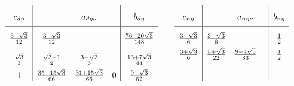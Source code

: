 %


\begin{eqnarray*}


\begin{array}{c|ccc|c}


c_{d\eta} & & a_{d\eta\nu} & & b_{d\eta}\vrule height6mm width0mm depth3mm\\


\hline


\frac{ 3-\sqrt{3}}{ 12} & \frac{ 3-\sqrt{3}}{ 12}&


& & \frac{ 76- 20\sqrt{3}}{ 143} \vrule height6mm width0mm depth3mm\\


\frac{ \sqrt{3}}{ 3} &


\frac{ \sqrt{3}-1}{ 2} &


\frac{ 3-\sqrt{3}}{ 6} 


& & \frac{ 13+ 7\sqrt{3}}{ 44} \vrule height6mm width0mm depth3mm\\


1& \frac{ 35 - 15\sqrt{3}}{ 66}&


\frac{ 31+15\sqrt{3}}{ 66} & 0


& \frac{ 9-\sqrt{3}}{ 52} 


\end{array}


%


\qquad


%


\begin{array}{c|ccc|c}


c_{n\eta} & & a_{n\eta\nu} & & b_{n\eta}\vrule height6mm width0mm depth3mm\\


\hline


\frac{ 3-\sqrt{3}}{ 6} &


\frac{ 3-\sqrt{3}}{ 6}& & & \frac{ 1}{ 2}\vrule height6mm width0mm depth3mm \\


\frac{ 3+\sqrt{3}}{ 6} &


\frac{ 5+\sqrt{3}}{ 22} & \frac{ 9+4\sqrt{3}}{ 33} & & \frac{ 1}{ 2}\\


\vrule height6mm width0mm depth3mm &&&&


\end{array}


\end{eqnarray*}






